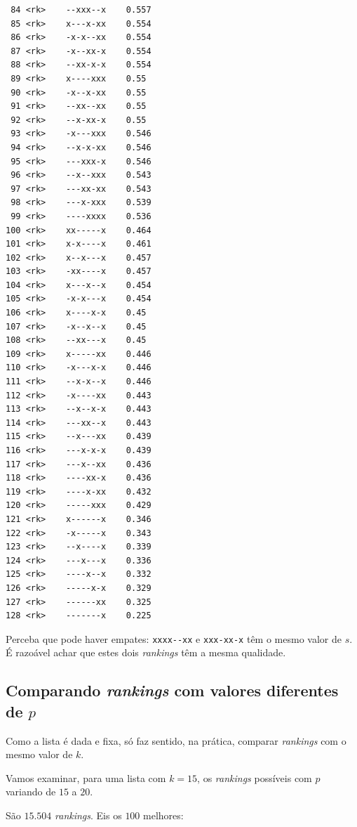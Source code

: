 \documentclass[
  letterpaper,
  DIV=11,
  numbers=noendperiod]{scrreprt}
\begin{document}
\begin{verbatim}
 84 <rk>    --xxx--x    0.557
 85 <rk>    x---x-xx    0.554
 86 <rk>    -x-x--xx    0.554
 87 <rk>    -x--xx-x    0.554
 88 <rk>    --xx-x-x    0.554
 89 <rk>    x----xxx    0.55 
 90 <rk>    -x--x-xx    0.55 
 91 <rk>    --xx--xx    0.55 
 92 <rk>    --x-xx-x    0.55 
 93 <rk>    -x---xxx    0.546
 94 <rk>    --x-x-xx    0.546
 95 <rk>    ---xxx-x    0.546
 96 <rk>    --x--xxx    0.543
 97 <rk>    ---xx-xx    0.543
 98 <rk>    ---x-xxx    0.539
 99 <rk>    ----xxxx    0.536
100 <rk>    xx-----x    0.464
101 <rk>    x-x----x    0.461
102 <rk>    x--x---x    0.457
103 <rk>    -xx----x    0.457
104 <rk>    x---x--x    0.454
105 <rk>    -x-x---x    0.454
106 <rk>    x----x-x    0.45 
107 <rk>    -x--x--x    0.45 
108 <rk>    --xx---x    0.45 
109 <rk>    x-----xx    0.446
110 <rk>    -x---x-x    0.446
111 <rk>    --x-x--x    0.446
112 <rk>    -x----xx    0.443
113 <rk>    --x--x-x    0.443
114 <rk>    ---xx--x    0.443
115 <rk>    --x---xx    0.439
116 <rk>    ---x-x-x    0.439
117 <rk>    ---x--xx    0.436
118 <rk>    ----xx-x    0.436
119 <rk>    ----x-xx    0.432
120 <rk>    -----xxx    0.429
121 <rk>    x------x    0.346
122 <rk>    -x-----x    0.343
123 <rk>    --x----x    0.339
124 <rk>    ---x---x    0.336
125 <rk>    ----x--x    0.332
126 <rk>    -----x-x    0.329
127 <rk>    ------xx    0.325
128 <rk>    -------x    0.225
\end{verbatim}

Perceba que pode haver empates: \texttt{xxxx-\/-xx} e \texttt{xxx-xx-x}
têm o mesmo valor de $s$. É razoável achar que estes dois
\emph{rankings} têm a mesma qualidade.

\subsection{\texorpdfstring{Comparando \emph{rankings} com valores
diferentes de
$p$}{Comparando rankings com valores diferentes de }}\label{comparando-rankings-com-valores-diferentes-de-p}

Como a lista é dada e fixa, só faz sentido, na prática, comparar
\emph{rankings} com o mesmo valor de $k$.

Vamos examinar, para uma lista com $k = 15$, os \emph{rankings}
possíveis com $p$ variando de $15$ a $20$.

São $15.504$ \emph{rankings}. Eis os $100$ melhores:
\end{document}
